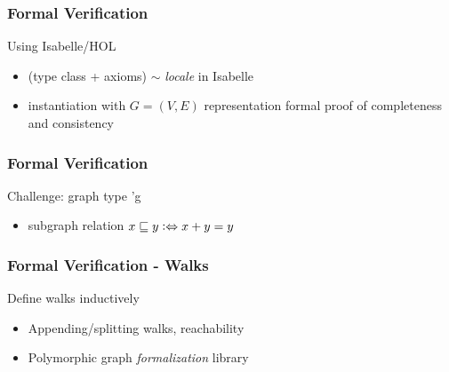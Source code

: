 \documentclass{beamer}
\newcommand*{\term}[1]{{\isaspacing\isastyle }}
\newcommand*{\Term}[1]{{\isaspacing\isastyle #1}}
\begin{document}
\begin{frame}
  \frametitle{Formal Verification}
  \begin{alertblock}{Using Isabelle/HOL}
    \begin{itemize}[<+->]
    \item (type class + axioms) $\sim$ \emph{locale} in Isabelle
      
      \vspace{2mm}
      \term{terms/locale_primitives}
    \item instantiation with $G=(V,E)$ representation \textrightarrow{} formal
      proof of completeness and consistency
    \end{itemize}
  \end{alertblock}
\end{frame}

\begin{frame}
  \frametitle{Formal Verification}
  \onslide<+->
  \begin{alertblock}{Challenge: graph type \Term{'g}}
    \begin{itemize}[<+->]
    \item subgraph relation $x \sqsubseteq y \vcentcolon \Leftrightarrow x + y =
      y$
    \end{itemize}
  \end{alertblock}
  \onslide<+->{\term{terms/has_elem}}
  
\end{frame}

\begin{frame}
  \frametitle{Formal Verification - Walks}
  \onslide<+->
  \begin{alertblock}{Define walks inductively}
    \vspace{2mm}
    \term{terms/vwalk_def}
  \end{alertblock}
  
  \begin{itemize}[<+->]
  \item Appending/splitting walks, reachability
  \item \textrightarrow{} Polymorphic graph \emph{formalization} library
  \end{itemize}
\end{frame}
\end{document}
